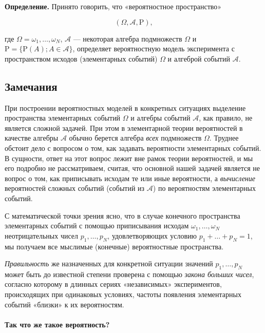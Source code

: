 \documentclass[11pt,a4paper]{article}
\begin{document}
\textbf{Определение.} Принято говорить, что «вероятностное пространство»

\[ \left( \Omega, \mathcal{A}, \mathrm{P} \right), \]

где \(\Omega = {\omega_1, \ldots, \omega_N}\), \(\mathcal{A}\) ---
некоторая алгебра подмножеств \(\Omega\) и
\(\mathrm{P} = \{ \mathrm{P}(A); A \in \mathcal{A} \}\), определяет
вероятностную модель эксперимента с пространством исходов (элементарных
событий) \(\Omega\) и алгеброй событий \(\mathcal{A}\).

    \hypertarget{ux437ux430ux43cux435ux447ux430ux43dux438ux44f}{%
\subsection{Замечания}\label{ux437ux430ux43cux435ux447ux430ux43dux438ux44f}}

При построении вероятностных моделей в конкретных ситуациях выделение
пространства элементарных событий \(\Omega\) и алгебры событий
\(\mathcal{A}\), как правило, не является сложной задачей. При этом в
элементарной теории вероятностей в качестве алгебры \(\mathcal{A}\)
обычно берется алгебра \emph{всех} подмножеств \(\Omega\). Труднее
обстоит дело с вопросом о том, как задавать вероятности элементарных
событий. В сущности, ответ на этот вопрос лежит вне рамок теории
вероятностей, и мы его подробно не рассматриваем, считая, что основной
нашей задачей является не вопрос о том, как приписывать исходам те или
иные вероятности, а \emph{вычисление} вероятностей сложных событий
(событий из \(\mathcal{A}\)) по вероятностям элементарных событий.

С математической точки зрения ясно, что в случае конечного пространства
элементарных событий с помощью приписывания исходам
\(\omega_1, \ldots , \omega_N\) неотрицательных чисел
\(p_1, \ldots , p_N\), удовлетворяющих условию
\(p_1 + \ldots + p_N = 1\), мы получаем все мыслимые (конечные)
вероятностные пространства.

\emph{Правильность} же назначенных для конкретной ситуации значений
\(p_1, \ldots , p_N\) может быть до известной степени проверена с
помощью \emph{закона больших чисел}, согласно которому в длинных сериях
«независимых» экспериментов, происходящих при одинаковых условиях,
частоты появления элементарных событий «близки» к их вероятностям.

    \hypertarget{ux442ux430ux43a-ux447ux442ux43e-ux436ux435-ux442ux430ux43aux43eux435-ux432ux435ux440ux43eux44fux442ux43dux43eux441ux442ux44c}{%
\paragraph{Так что же такое
вероятность?}\label{ux442ux430ux43a-ux447ux442ux43e-ux436ux435-ux442ux430ux43aux43eux435-ux432ux435ux440ux43eux44fux442ux43dux43eux441ux442ux44c}}
\end{document}
